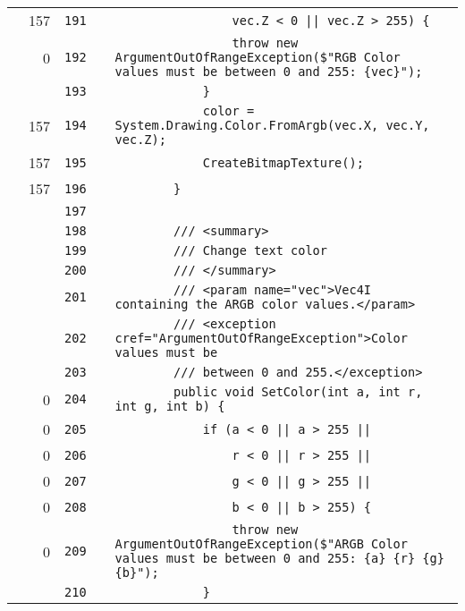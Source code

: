\documentclass[a4paper,landscape,10pt]{article}
\begin{document}
\begin{longtable}[l]{lrrll}
\cellcolor{green} & 157 & \verb~191~ & & \verb~                vec.Z < 0 || vec.Z > 255) {~\\
\cellcolor{red} & 0 & \verb~192~ & & \verb~                throw new ArgumentOutOfRangeException($"RGB Color values must be between 0 and 255: {vec}");~\\
\cellcolor{gray} &  & \verb~193~ & & \verb~            }~\\
\cellcolor{green} & 157 & \verb~194~ & & \verb~            color = System.Drawing.Color.FromArgb(vec.X, vec.Y, vec.Z);~\\
\cellcolor{green} & 157 & \verb~195~ & & \verb~            CreateBitmapTexture();~\\
\cellcolor{green} & 157 & \verb~196~ & & \verb~        }~\\
\cellcolor{gray} &  & \verb~197~ & & \verb~~\\
\cellcolor{gray} &  & \verb~198~ & & \verb~        /// <summary>~\\
\cellcolor{gray} &  & \verb~199~ & & \verb~        /// Change text color~\\
\cellcolor{gray} &  & \verb~200~ & & \verb~        /// </summary>~\\
\cellcolor{gray} &  & \verb~201~ & & \verb~        /// <param name="vec">Vec4I containing the ARGB color values.</param>~\\
\cellcolor{gray} &  & \verb~202~ & & \verb~        /// <exception cref="ArgumentOutOfRangeException">Color values must be~\\
\cellcolor{gray} &  & \verb~203~ & & \verb~        /// between 0 and 255.</exception>~\\
\cellcolor{red} & 0 & \verb~204~ & & \verb~        public void SetColor(int a, int r, int g, int b) {~\\
\cellcolor{red} & 0 & \verb~205~ & & \verb~            if (a < 0 || a > 255 ||~\\
\cellcolor{red} & 0 & \verb~206~ & & \verb~                r < 0 || r > 255 ||~\\
\cellcolor{red} & 0 & \verb~207~ & & \verb~                g < 0 || g > 255 ||~\\
\cellcolor{red} & 0 & \verb~208~ & & \verb~                b < 0 || b > 255) {~\\
\cellcolor{red} & 0 & \verb~209~ & & \verb~                throw new ArgumentOutOfRangeException($"ARGB Color values must be between 0 and 255: {a} {r} {g} {b}");~\\
\cellcolor{gray} &  & \verb~210~ & & \verb~            }~\\

\end{longtable}
\end{document}
